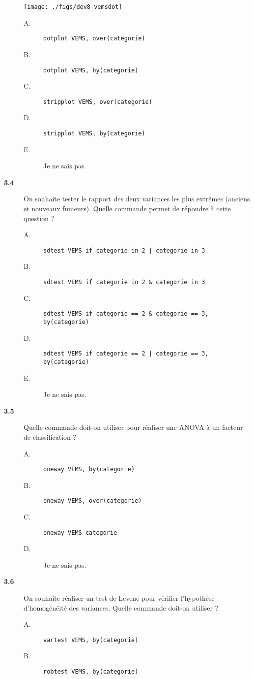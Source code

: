 \begin{description}
\begin{center}
  \texttt{[image: ./figs/dev8\_vemsdot]}
\end{center}
\begin{description}
\item[A.] \verb|dotplot VEMS, over(categorie)|
\item[B.] \verb|dotplot VEMS, by(categorie)|
\item[C.] \verb|stripplot VEMS, over(categorie)|
\item[D.] \verb|stripplot VEMS, by(categorie)|
\item[E.] Je ne sais pas.
\end{description}
\item[\bf 3.4] On souhaite tester le rapport des deux variances les plus
  extrêmes (anciens et nouveaux fumeurs). Quelle commande permet de répondre
  à cette question ? 
\begin{description}
\item[A.] \verb+sdtest VEMS if categorie in 2 | categorie in 3+
\item[B.] \verb+sdtest VEMS if categorie in 2 & categorie in 3+
\item[C.] \verb+sdtest VEMS if categorie == 2 & categorie == 3, by(categorie)+
\item[D.] \verb+sdtest VEMS if categorie == 2 | categorie == 3, by(categorie)+
\item[E.] Je ne sais pas.
\end{description}
\item[\bf 3.5] Quelle commande doit-on utiliser pour réaliser une ANOVA à un
  facteur de classification ? 
\begin{description}
\item[A.] \verb|oneway VEMS, by(categorie)|
\item[B.] \verb|oneway VEMS, over(categorie)|
\item[C.] \verb|oneway VEMS categorie|
\item[D.] Je ne sais pas.
\end{description}
\item[\bf 3.6] On souhaite réaliser un test de Levene pour vérifier
  l'hypothèse d'homogénéité des variances. Quelle commande doit-on utiliser
  ? 
\begin{description}
\item[A.] \verb|vartest VEMS, by(categorie)|
\item[B.] \verb|robtest VEMS, by(categorie)|

\end{description}
\end{description}
